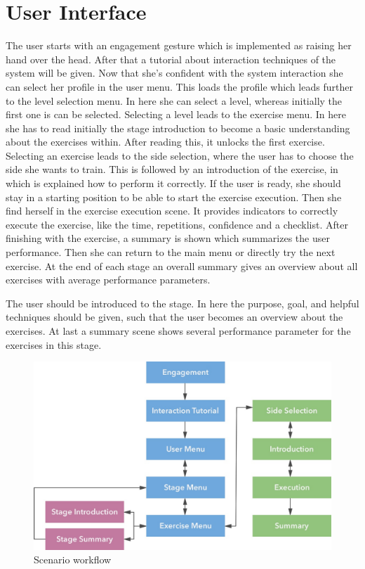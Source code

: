 \section{User Interface}\label{5_4_userInterface}
The user starts with an engagement gesture which is implemented as raising her hand over the head. After that a tutorial about interaction techniques of the system will be given. Now that she's confident with the system interaction she can select her profile in the user menu. This loads the profile which leads further to the level selection menu. In here she can select a level, whereas initially the first one is can be selected. Selecting a level leads to the exercise menu. In here she has to read initially the stage introduction to become a basic understanding about the exercises within. After reading this, it unlocks the first exercise. Selecting an exercise leads to the side selection, where the user has to choose the side she wants to train. This is followed by an introduction of the exercise, in which is explained how to perform it correctly. If the user is ready, she should stay in a starting position to be able to start the exercise execution. Then she find herself in the exercise execution scene. It provides indicators to correctly execute the exercise, like the time, repetitions, confidence and a checklist. After finishing with the exercise, a summary is shown which summarizes the user performance. Then she can return to the main menu or directly try the next exercise. At the end of each stage an overall summary gives an overview about all exercises with average performance parameters.

The user should be introduced to the stage. In here the purpose, goal, and helpful techniques should be given, such that the user becomes an overview about the exercises. At last a summary scene shows several performance parameter for the exercises in this stage.

\begin{figure}[htb]
	\centering
	\begin{minipage}[t]{1\linewidth}
		\centering
		\includegraphics[width=1\linewidth]{Pictures/5_1_UIWorkflow}
		\caption{Scenario workflow}
		\label{fig:scenarioWorkflow}
	\end{minipage}
\end{figure}
